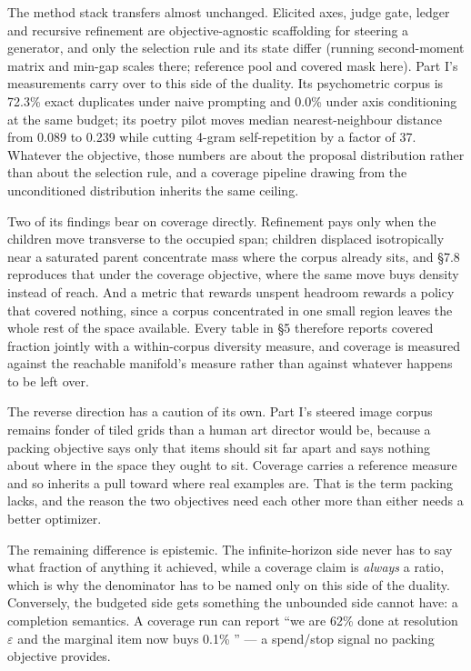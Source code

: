 \documentclass[11pt]{article}
\theoremstyle{plain}
\theoremstyle{definition}
\begin{document}
The method stack transfers almost unchanged. Elicited axes, judge gate, ledger and recursive refinement are objective-agnostic scaffolding for steering a generator, and only the selection rule and its state differ (running second-moment matrix and min-gap scales there; reference pool and covered mask here). Part I's measurements carry over to this side of the duality. Its psychometric corpus is 72.3\% exact duplicates under naive prompting and 0.0\% under axis conditioning at the same budget; its poetry pilot moves median nearest-neighbour distance from 0.089 to 0.239 while cutting 4-gram self-repetition by a factor of 37. Whatever the objective, those numbers are about the proposal distribution rather than about the selection rule, and a coverage pipeline drawing from the unconditioned distribution inherits the same ceiling.

Two of its findings bear on coverage directly. Refinement pays only when the children move transverse to the occupied span; children displaced isotropically near a saturated parent concentrate mass where the corpus already sits, and \S{}7.8 reproduces that under the coverage objective, where the same move buys density instead of reach. And a metric that rewards unspent headroom rewards a policy that covered nothing, since a corpus concentrated in one small region leaves the whole rest of the space available. Every table in \S{}5 therefore reports covered fraction jointly with a within-corpus diversity measure, and coverage is measured against the reachable manifold's measure rather than against whatever happens to be left over.

The reverse direction has a caution of its own. Part I's steered image corpus remains fonder of tiled grids than a human art director would be, because a packing objective says only that items should sit far apart and says nothing about where in the space they ought to sit. Coverage carries a reference measure and so inherits a pull toward where real examples are. That is the term packing lacks, and the reason the two objectives need each other more than either needs a better optimizer.

The remaining difference is epistemic. The infinite-horizon side never has to say what fraction of anything it achieved, while a coverage claim is \emph{always} a ratio, which is why the denominator has to be named only on this side of the duality. Conversely, the budgeted side gets something the unbounded side cannot have: a completion semantics. A coverage run can report ``we are 62\% done at resolution $\varepsilon$ and the marginal item now buys 0.1\% '' --- a spend/stop signal no packing objective provides.
\end{document}

